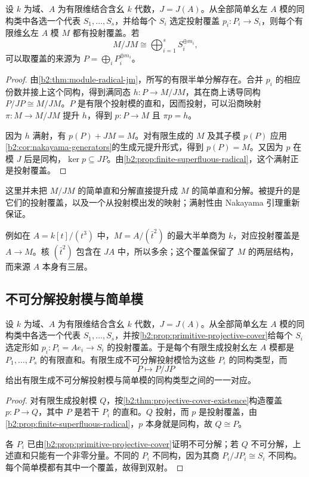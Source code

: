 \begin{theorem}\label{b2:thm:projective-cover-existence}
	设 \(k\) 为域、\(A\) 为有限维结合含幺 \(k\) 代数，\(J=J(A)\)。从全部简单幺左 \(A\) 模的同构类中各选一个代表 \(S_1,\ldots,S_s\)，并给每个 \(S_i\) 选定投射覆盖 \(p_i:P_i\to S_i\)，则每个有限维幺左 \(A\) 模 \(M\) 都有投射覆盖。若
	\[
		M/JM\cong\bigoplus_{i=1}^s S_i^{\oplus m_i},
	\]
	可以取覆盖的来源为 \(P=\bigoplus_iP_i^{\oplus m_i}\)。
\end{theorem}
\begin{proof}
	由\cref{b2:thm:module-radical-jm}，所写的有限半单分解存在。合并 \(p_i\) 的相应份数并接上这个同构，得到满同态 \(h:P\to M/JM\)，其在商上诱导同构 \(P/JP\cong M/JM\)。\(P\) 是有限个投射模的直和，因而投射，可以沿商映射 \(\pi:M\to M/JM\) 提升 \(h\)，得到 \(p:P\to M\) 且 \(\pi p=h\)。

	因为 \(h\) 满射，有 \(p(P)+JM=M\)。对有限生成的 \(M\) 及其子模 \(p(P)\) 应用\cref{b2:cor:nakayama-generators}的生成元提升形式，得到 \(p(P)=M\)。又因为 \(p\) 在模 \(J\) 后是同构，\(\ker p\subseteq JP\)。由\cref{b2:prop:finite-superfluous-radical}，这个满射正是投射覆盖。
\end{proof}

这里并未把 \(M/JM\) 的简单直和分解直接提升成 \(M\) 的简单直和分解。被提升的是它们的投射覆盖，以及一个从投射模出发的映射；满射性由 Nakayama 引理重新保证。

\ProseParagraphBreak
例如在 \(A=k[t]/(t^3)\) 中，\(M=A/(\bar t^2)\) 的最大半单商为 \(k\)，对应投射覆盖是 \(A\to M\)。核 \((\bar t^2)\) 包含在 \(JA\) 中，所以多余；这个覆盖保留了 \(M\) 的两层结构，而来源 \(A\) 本身有三层。

\subsection{不可分解投射模与简单模}
\label{b2:subsec:1503:05}

\begin{theorem}\label{b2:thm:indecomposable-projective-simple}
	设 \(k\) 为域、\(A\) 为有限维结合含幺 \(k\) 代数，\(J=J(A)\)。从全部简单幺左 \(A\) 模的同构类中各选一个代表 \(S_1,\ldots,S_s\)，并按\cref{b2:prop:primitive-projective-cover}给每个 \(S_i\) 选定形如 \(p_i:P_i=Ae_i\to S_i\) 的投射覆盖。于是每个有限生成投射幺左 \(A\) 模都是 \(P_1,\ldots,P_s\) 的有限直和。有限生成不可分解投射模恰为这些 \(P_i\) 的同构类型，而
	\[
		P\longmapsto P/JP
	\]
	给出有限生成不可分解投射模与简单模的同构类型之间的一一对应。
\end{theorem}
\begin{proof}
	对有限生成投射模 \(Q\)，按\cref{b2:thm:projective-cover-existence}构造覆盖 \(p:P\to Q\)，其中 \(P\) 是若干 \(P_i\) 的直和。\(Q\) 投射，而 \(p\) 是投射覆盖，由\cref{b2:prop:finite-superfluous-radical}，\(p\) 本身就是同构，故 \(Q\cong P\)。

	各 \(P_i\) 已由\cref{b2:prop:primitive-projective-cover}证明不可分解；若 \(Q\) 不可分解，上述直和只能有一个非零分量。不同的 \(P_i\) 不同构，因为其商 \(P_i/JP_i\cong S_i\) 不同构。每个简单模都有其中一个覆盖，故得到双射。
\end{proof}

